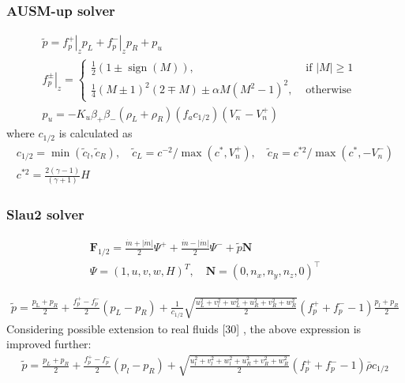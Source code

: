 \subsubsection{AUSM-up solver}

$$
\begin{array}{ll}
\tilde{p}=\left.f_{p}^{+}\right|_{z} p_{L}+\left.f_{p}^{-}\right|_{z} p_{R}+p_{u} & \\
\left.f_{p}^{\pm}\right|_{z}=\left\{\begin{array}{ll}
\frac{1}{2}(1 \pm \operatorname{sign}(M)), & \text { if }|M| \geqslant 1 \\
\frac{1}{4}(M \pm 1)^{2}(2 \mp M) \pm \alpha M\left(M^{2}-1\right)^{2}, & \text { otherwise }
\end{array}\right. \\
p_{u}=-K_{u} \beta_{+} \beta_{-}\left(\rho_{L}+\rho_{R}\right)\left(f_{a} c_{1 / 2}\right)\left(V_{n}^{-}-V_{n}^{+}\right)
\end{array}
$$
where $c_{1 / 2}$ is calculated as
$$
\begin{array}{l}
c_{1 / 2}=\min \left(\tilde{c}_{l}, \tilde{c}_{R}\right), \quad \tilde{c}_{L}=c^{-2} / \max \left(c^{*}, V_{n}^{+}\right), \quad \tilde{c}_{R}=c^{* 2} / \max \left(c^{*},-V_{n}^{-}\right) \\
c^{* 2}=\frac{2(\gamma-1)}{(\gamma+1)} H
\end{array}
$$

\subsubsection{Slau2 solver}
$$
\begin{array}{l}
\mathbf{F}_{1 / 2}=\frac{\dot{m}+|\dot{m}|}{2} \Psi^{+}+\frac{\dot{m}-|\dot{m}|}{2} \Psi^{-}+\tilde{p} \mathbf{N} \\
\Psi=(1, u, v, w, H)^{T}, \quad \mathbf{N}=\left(0, n_{x}, n_{y}, n_{z}, 0\right)^{\top}
\end{array}
$$

$$
\begin{array}{l}
\tilde{p}=\frac{p_{\mathrm{L}}+p_{R}}{2}+\frac{f_{p}^{+}-f_{p}^{-}}{2}\left(p_{L}-p_{R}\right)+\frac{1}{c_{1 / 2}} \sqrt{\frac{u_{L}^{2}+v_{l}^{2}+w_{L}^{2}+u_{R}^{2}+v_{R}^{2}+w_{R}^{2}}{2}}\left(f_{p}^{+}+f_{p}^{-}-1\right) \frac{p_{l}+p_{R}}{2}
\end{array}
$$
Considering possible extension to real fluids [30] , the above expression is improved further:
$$
\begin{array}{l}
\tilde{p}=\frac{p_{L}+p_{R}}{2}+\frac{f_{p}^{+}-f_{p}^{-}}{2}\left(p_{l}-p_{R}\right)+\sqrt{\frac{u_{l}^{2}+v_{l}^{2}+w_{l}^{2}+u_{R}^{2}+v_{R}^{2}+w_{R}^{2}}{2}}\left(f_{p}^{+}+f_{p}^{-}-1\right) \bar{\rho} c_{1 / 2}
\end{array}
$$


